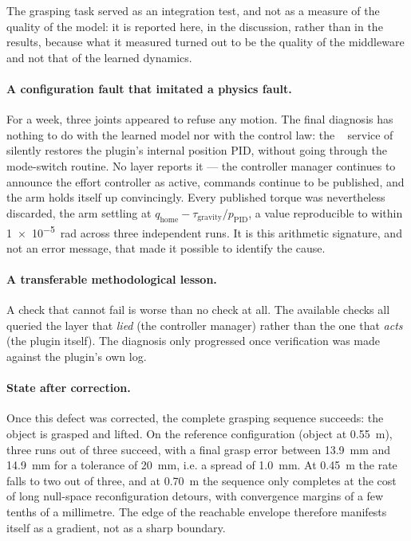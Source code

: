 \documentclass[a4paper, oneside]{article}
\newcommand{\code}[1]{%
    \mbox{\ttfamily\small%
        \detokenize{#1}%
    }%
}
\newcommand{\q}{\ensuremath{q}}
\begin{document}
The grasping task served as an integration test, and not as a measure of the
quality of the model: it is reported here, in the discussion, rather than in
the results, because what it measured turned out to be the quality of the
middleware and not that of the learned dynamics.

\paragraph{A configuration fault that imitated a physics fault.}
For a week, three joints appeared to refuse any motion. The final diagnosis has
nothing to do with the learned model nor with the control law: the
\code{ResetWorld} service of \code{mujoco_ros2_control} silently restores the
plugin's internal position PID, without going through the mode-switch routine.
No layer reports it --- the controller manager continues to announce the effort
controller as active, commands continue to be published, and the arm holds
itself up convincingly. Every published torque was nevertheless discarded, the
arm settling at
$\q_{\mathrm{home}} - \tau_{\mathrm{gravity}}/p_{\mathrm{PID}}$, a value
reproducible to within \SI{1e-5}{\radian} across three independent runs. It is
this arithmetic signature, and not an error message, that made it possible to
identify the cause.

\paragraph{A transferable methodological lesson.} A check that cannot fail is
worse than no check at all. The available checks all queried the layer that
\emph{lied} (the controller manager) rather than the one that \emph{acts} (the
plugin itself). The diagnosis only progressed once verification was made
against the plugin's own log.

\paragraph{State after correction.} Once this defect was corrected, the
complete grasping sequence succeeds: the object is grasped and lifted. On the
reference configuration (object at \SI{0.55}{\meter}), three runs out of three
succeed, with a final grasp error between \SI{13.9}{\milli\meter} and
\SI{14.9}{\milli\meter} for a tolerance of \SI{20}{\milli\meter}, i.e. a spread
of \SI{1.0}{\milli\meter}. At \SI{0.45}{\meter} the rate falls to two out of
three, and at \SI{0.70}{\meter} the sequence only completes at the cost of long
null-space reconfiguration detours, with convergence margins of a few tenths of
a millimetre. The edge of the reachable envelope therefore manifests itself as
a gradient, not as a sharp boundary.
\end{document}
